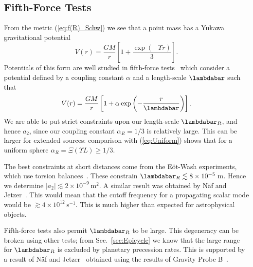 \documentclass[aps,prd,amsfonts,amssymb,amsmath,nofootinbib,reprint,showpacs]{revtex4-1}
\newcommand{\eqnref}[1]{(\ref{eq:#1})}
\newcommand{\secref}[1]{Sec.\ \ref{sec:#1}}
\newcommand{\units}[1]{\ensuremath{~\mathrm{#1}}}
\begin{document}
\subsection{Fifth-Force Tests\label{sec:Fifth}}

From the metric \eqnref{f(R)_Schw} we see that a point mass has a Yukawa gravitational potential~\cite{Stelle1978, Capozziello2009a, Naf2010}
\begin{equation}
V(r) = \frac{GM}{r}\left[1 + \frac{\exp(- \Upsilon r)}{3}\right].
\end{equation}
Potentials of this form are well studied in fifth-force tests~\cite{Will2006, Adelberger2009, Adelberger2003} which consider a potential defined by a coupling constant $\alpha$ and a length-scale $\lambdabar$ such that
\begin{equation}
V(r) = \frac{GM}{r}\left[1 + \alpha\exp\left(-\frac{r}{\lambdabar}\right)\right].
\end{equation}
We are able to put strict constraints upon our length-scale $\lambdabar_R$, and hence $a_2$, since our coupling constant $\alpha_R = 1/3$ is relatively large. This can be larger for extended sources: comparison with \eqnref{Uniform} shows that for a uniform sphere $\alpha_R = \Xi(\Upsilon L) \geq 1/3$.

The best constraints at short distances come from the E\"{o}t-Wash experiments, which use torsion balances~\cite{Kapner2007a, Hoyle2004}. These constrain $\lambdabar_R \lesssim 8\times 10^{-5}\units{m}$. Hence we determine $|a_2| \lesssim 2 \times 10^{-9}\units{m^2}$. A similar result was obtained by N\"{a}f and Jetzer~\cite{Naf2010}. This would mean that the cutoff frequency for a propagating scalar mode would be $\gtrsim 4 \times 10^{12}\units{s^{-1}}$. This is much higher than expected for astrophysical objects.

Fifth-force tests also permit $\lambdabar_R$ to be large. This degeneracy can be broken using other tests; from \secref{Epicycle} we know that the large range for $\lambdabar_R$ is excluded by planetary precession rates. This is supported by a result of N\"{a}f and Jetzer~\cite{Naf2010} obtained using the results of Gravity Probe B~\cite{Everitt2009}.
\end{document}
